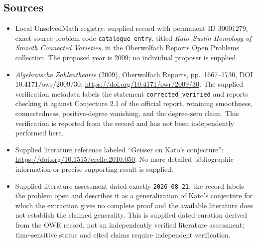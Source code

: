 \documentclass[11pt]{article}
\begin{document}
\subsection{Sources}
\begin{itemize}
\item Local UnsolvedMath registry: supplied record with permanent ID \(30001279\), exact source problem code \texttt{catalogue entry}, titled \emph{Kato--Suslin Homology of Smooth Connected Varieties}, in the Oberwolfach Reports Open Problems collection. The proposed year is 2009; no individual proposer is supplied.
\item \emph{Algebraische Zahlentheorie} (2009), Oberwolfach Reports, pp.\ 1667--1730, DOI 10.4171/owr/2009/30. \url{https://doi.org/10.4171/owr/2009/30}. The supplied verification metadata labels the statement \texttt{corrected\_verified} and reports checking it against Conjecture 2.1 of the official report, retaining smoothness, connectedness, positive-degree vanishing, and the degree-zero claim. This verification is reported from the record and has not been independently performed here.
\item Supplied literature reference labeled ``Geisser on Kato's conjecture'': \url{https://doi.org/10.1515/crelle.2010.050}. No more detailed bibliographic information or precise supporting result is supplied.
\item Supplied literature assessment dated exactly \texttt{2026-08-21}: the record labels the problem open and describes it as a generalization of Kato's conjecture for which the extraction gives no complete proof and the available literature does not establish the claimed generality. This is supplied dated curation derived from the OWR record, not an independently verified literature assessment; time-sensitive status and cited claims require independent verification.
\end{itemize}
\end{document}
